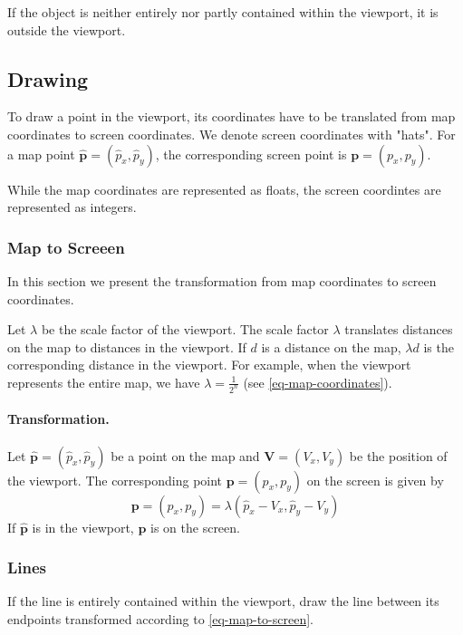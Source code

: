 \documentclass[11pt]{article}
\newcommand{\pb}{\mathbf{p}}
\newcommand{\pbhat}{\hat{\mathbf{p}}}
\newcommand{\phat}{\hat{p}}
\newcommand{\Vb}{\mathbf{V}}
\begin{document}
If the object is neither entirely nor partly contained within the viewport, it
is outside the viewport.

\subsection{Drawing}
\label{sec-map-drawing}

To draw a point in the viewport, its coordinates have to be
translated from map coordinates to screen coordinates. We denote screen
coordinates with "hats". For a map point $\pbhat=(\phat_{x}, \phat_{y})$, the 
corresponding screen point is $\pb=(p_{x}, p_{y})$.

While the map coordinates are represented as floats, the screen coordintes are
represented as integers.

\subsubsection{Map to Screeen}
\label{sec-map-drawing-to-screen}
In this section we present the transformation from map coordinates to screen
coordinates.


Let $\lambda$ be the scale factor of the viewport. 
The scale factor $\lambda$ translates distances on the map to
distances in the viewport. If $d$ is a distance on the map, $\lambda d$ is the
corresponding distance in the viewport. For example, when the viewport
represents the entire map, we have $\lambda = \frac{1}{2^{n}}$ (see 
\eqref{eq-map-coordinates}).

\paragraph{Transformation.}
Let $\pbhat=(\phat_{x}, \phat_{y})$ be a point on the map and 
$\Vb=(V_{x}, V_{y})$ be the position of the viewport. The corresponding point 
$\pb=(p_{x}, p_{y})$ on the screen is given by
\begin{equation} 
    \pb = (p_{x}, p_{y})  = \lambda(\phat_{x} - V_{x}, \phat_{y} - V_{y})
    \label{eq-map-to-screen}
\end{equation} 
If $\pbhat$ is in the viewport, $\pb$ is on the screen.

\subsubsection{Lines}
\label{sec-map-drawing-lines}
If the line is entirely contained within the viewport, draw the line between 
its endpoints transformed according to \eqref{eq-map-to-screen}.
\end{document}
